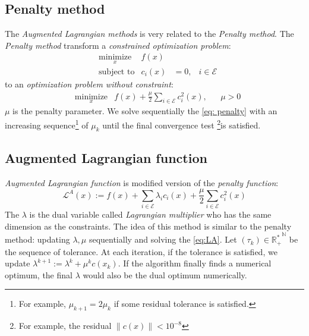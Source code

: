 \documentclass{report}
\begin{document}
\subsection{Penalty method}
The \emph{Augmented Lagrangian methods} is very related to the \emph{Penalty method}. The \emph{Penalty method} transform a \emph{constrained optimization problem}:
\begin{equation}
\begin{aligned}	
&\underset{x}{\text{minimize}}                  &f(x) &  & \\
&\text{subject to}     & c_i(x)  &= 0,  & i \in \mathcal{E}
\end{aligned}
\end{equation}
to an \emph{optimization problem without constraint}:
\begin{equation}
\label{eq: penalty}
\begin{aligned}	
&\underset{x}{\text{minimize}}       &f(x) + \frac{\mu}{2} \sum_{i \in \mathcal{E}} c_i^2(x),&  &\mu >0
\end{aligned}
\end{equation}
$\mu$ is the penalty parameter. We solve sequentially the \ref{eq: penalty} with an increasing sequence\footnote{For example, $\mu_{k+1} = 2 \mu_k$ if some residual tolerance is satisfied.} of $\mu_k$ until the final convergence test \footnote{For example, the residual $\|c(x)\| < 10^{-8}$}is satisfied.

\subsection{Augmented Lagrangian function}
\emph{Augmented Lagrangian function} is modified version of the \emph{penalty function}:
\begin{equation}
\label{eq:LA}
\mathcal{L}^A (x):= f(x) + \sum_{i \in \mathcal{E}} \lambda_i c_i(x) +\frac{\mu}{2} \sum_{i \in \mathcal{E}} c_i^2(x)
\end{equation}
The $\lambda$ is the dual variable called \emph{Lagrangian multiplier} who has the same dimension as the constraints. The idea of this method is similar to the penalty method: updating $\lambda, \mu$ sequentially and solving the \ref{eq:LA}. Let $(\tau_k) \in \mathbb{R^*_+}^\mathbb{N}$ be the sequence of tolerance. At each iteration, if the tolerance is satisfied, we update $\lambda^{k+1} := \lambda^{k} + \mu^k c(x_k)$. If the algorithm finally finds a numerical optimum, the final $\lambda$ would also be the dual optimum numerically.
\end{document}
